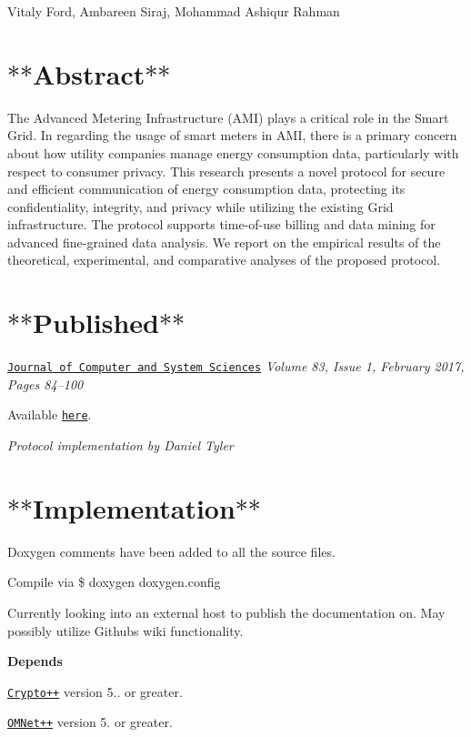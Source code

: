 Vitaly Ford, Ambareen Siraj, Mohammad Ashiqur Rahman

\section*{$\ast$$\ast$\+Abstract$\ast$$\ast$}

The Advanced Metering Infrastructure (A\+MI) plays a critical role in the Smart Grid. In regarding the usage of smart meters in A\+MI, there is a primary concern about how utility companies manage energy consumption data, particularly with respect to consumer privacy. This research presents a novel protocol for secure and efficient communication of energy consumption data, protecting its confidentiality, integrity, and privacy while utilizing the existing Grid infrastructure. The protocol supports time-\/of-\/use billing and data mining for advanced fine-\/grained data analysis. We report on the empirical results of the theoretical, experimental, and comparative analyses of the proposed protocol.

\section*{$\ast$$\ast$\+Published$\ast$$\ast$}

\href{http://www.sciencedirect.com/science/article/pii/S0022000016300472}{\tt Journal of Computer and System Sciences} {\itshape Volume 83, Issue 1, February 2017, Pages 84–100}

Available \href{https://www.researchgate.net/publication/305077004_Secure_and_efficient_protection_of_consumer_privacy_in_Advanced_Metering_Infrastructure_supporting_fine-grained_data_analysis}{\tt here}.

{\itshape Protocol implementation by Daniel Tyler}

\section*{$\ast$$\ast$\+Implementation$\ast$$\ast$}

Doxygen comments have been added to all the source files.

Compile via {\ttfamily \$ doxygen doxygen.\+config}

Currently looking into an external host to publish the documentation on. May possibly utilize Github\textquotesingle{}s wiki functionality.

{\bfseries Depends}

\href{http://cryptopp.com/}{\tt Crypto++} version 5.. or greater.

\href{https://omnetpp.org/}{\tt O\+M\+Net++} version 5. or greater. 